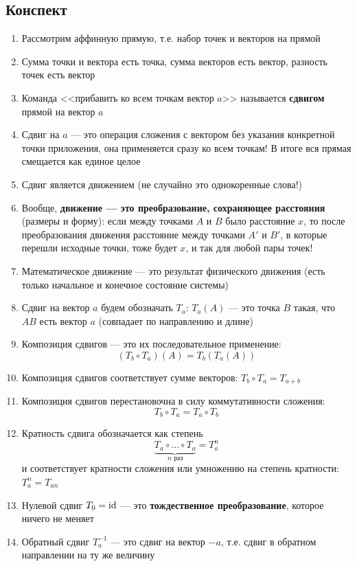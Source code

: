 \subsection{Конспект}
\begin{enumerate}\setlength{\itemsep}{1pt}
\item Рассмотрим аффинную прямую, т.е. набор точек и векторов на прямой
\item Сумма точки и вектора есть точка, сумма векторов есть вектор, разность точек есть вектор
\item Команда <<прибавить ко всем точкам вектор $a$>> называется \textbf{сдвигом} прямой на вектор $a$
\item Сдвиг на $a$ --- это операция сложения с вектором без указания конкретной точки приложения, она применяется сразу ко всем точкам! В итоге вся прямая смещается как единое целое
\item Сдвиг является движением (не случайно это однокоренные слова!)
\item Вообще, \textbf{движение --- это преобразование, сохраняющее расстояния} (размеры и форму): если между точками $A$ и $B$ было расстояние $x$, то после преобразования движения расстояние между точками $A'$ и $B'$, в которые перешли исходные точки, тоже будет $x$, и так для любой пары точек!
\item Математическое движение --- это результат физического движения (есть только начальное и конечное состояние системы)
\item Сдвиг на вектор $a$ будем обозначать $T_a$: $T_a(A)$ --- это точка $B$ такая, что $AB$ есть вектор $a$ (совпадает по направлению и длине)
\item Композиция сдвигов --- это их последовательное применение: $$(T_b\circ T_a)(A)=T_b(T_a(A))$$
\item Композиция сдвигов соответствует сумме векторов: $T_b\circ T_a=T_{a+b}$
\item Композиция сдвигов перестановочна в силу коммутативности сложения: $$T_b\circ T_a=T_a\circ T_b$$
\item Кратность сдвига обозначается как степень
$$
\underbrace{T_a\circ\dots\circ T_a}_{n\mbox{ раз}}=T_a^n
$$
и соответствует кратности сложения или умножению на степень кратности: $T_a^n=T_{an}$
\item Нулевой сдвиг $T_0=\mathrm{id}$ --- это \textbf{тождественное преобразование}, которое ничего не меняет
\item Обратный сдвиг $T_a^{-1}$ --- это сдвиг на вектор $-a$, т.е. сдвиг в обратном направлении на ту же величину

\end{enumerate}
